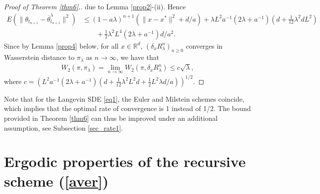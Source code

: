 \documentclass[a4paper]{article}
\def\pl{\pi_{\lambda}}
\def\Rl{R_{\lambda}}
\def\Rd{\mathbb{R}^d}
\def\tlb{\overline{\theta}^{\lambda}}
\def\t{{\theta}}
\begin{document}
\begin{proof}[Proof of Theorem \ref{thm6}.]
	due to Lemma \ref{prop2}-(ii). Hence
	\begin{align}
	E\left(\|\t_{t_{n+1}}-\tlb_{t_{n+1}}\|^2\right)&\leq (1-a\lambda)^{n+1}(\|x-x^*\|^2+d/a)+ \lambda L^2a^{-1}(2\lambda+a^{-1})(d+\tfrac{1}{12}\lambda^2d L^2) \nonumber \\
	&\qquad +\tfrac{1}{2}\lambda^2 L^4(2\lambda+a^{-1})d/a^2. \label{dacom}
	\end{align}
	Since by Lemma \ref{prop4} below, for all $x \in \Rd$, $(\delta_x \Rl^n)_{n\geq 0}$ converges in Wasserstein distance to $\pl$ as $n \rightarrow \infty$, we have that
	\begin{align*}
	W_2(\pi,\pl)=\lim\limits_{n \rightarrow \infty}W_2(\pi,\delta_x \Rl^n)\leq c \sqrt{\lambda},
	\end{align*}
	where $c=\left(L^2 a^{-1}(2\lambda+a^{-1})(d+\tfrac{1}{12}\lambda^2L^2d+\tfrac{1}{2}L^2\lambda d/a) \right)^{1/2}$.
\end{proof}
Note that for the Langevin SDE \eqref{eq1}, the Euler and Milstein schemes coincide, which implies that the optimal rate of convergence is 1 instead of 1/2. The bound provided in Theorem \ref{thm6} can thus be improved under an additional assumption, see Subsection \ref{sec_rate1}.

\section{Ergodic properties of the recursive scheme (\ref{aver})}\label{sec_aver}
\end{document}
